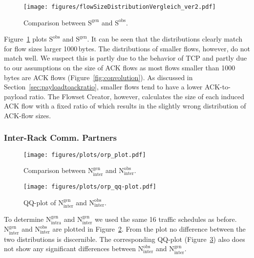 \documentclass[journal,10pt]{IEEEtran}
\newcommand{\partners}[2]{\ensuremath{\mathrm{N}^{\mathrm{#1}}_{\mathrm{#2}}}}
\newcommand{\size}[1]{\ensuremath{\mathrm{S}  ^{\mathrm{#1}}}}
\begin{document}
		\begin{figure}
			\centering
\texttt{[image: figures/flowSizeDistributionVergleich\_ver2.pdf]}
				\caption{Comparison between \size{gen} and \size{obs}.}
				
				\label{fig:flowSizeDistributionVergleich}
				








			
		\end{figure}			
			
			
			Figure~\ref{fig:flowSizeDistributionVergleich} plots \size{obs} and \size{gen}.
			It can be seen that the distributions clearly match for flow sizes larger 1000\,bytes. 
			The distributions of smaller flows, however, do not match well.
			We suspect this is partly due to the behavior of TCP and partly due to our assumptions on the size of ACK flows
			as most flows smaller than 1000\,bytes are ACK flows (Figure~\ref{fig:convolution}).
			As discussed in Section~\ref{sec:payloadtoackratio}, smaller flows tend to have a lower ACK-to-payload ratio.
			The Flowset Creator, however, calculates the size of each induced ACK flow with a fixed ratio of  which results in 
			the slightly wrong distribution of ACK-flow sizes.
			
			
		\subsubsection{Inter-Rack Comm. Partners}
			\begin{figure}
				\centering
					\texttt{[image: figures/plots/orp\_plot.pdf]}
					\caption{Comparison between \partners{gen}{inter} and \partners{obs}{inter}.}
					\label{fig:orp_plot}
\end{figure}
		
			\begin{figure}
				\centering
					\texttt{[image: figures/plots/orp\_qq-plot.pdf]}
					\caption{QQ-plot of \partners{gen}{inter} and \partners{obs}{inter}.}
					
					\label{fig:orp_qq-plot}
\end{figure}			
			
			To determine
			\partners{gen}{intra} and \partners{gen}{inter}
			we used the same 16 traffic schedules as before.
\partners{gen}{inter} and \partners{obs}{inter} are plotted in Figure~\ref{fig:orp_plot}.
			From the plot no difference between the two distributions is discernible.
			The corresponding QQ-plot (Figure~\ref{fig:orp_qq-plot}) also does not show any significant differences
			between \partners{obs}{inter} and \partners{gen}{inter}.
		
\end{document}
